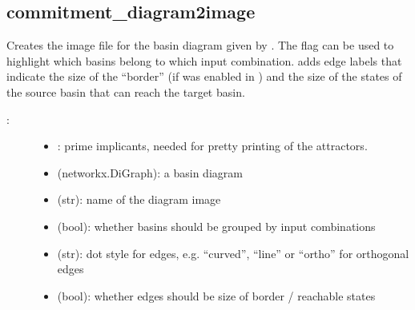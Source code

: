\documentclass[letterpaper,10pt,english]{sphinxmanual}
\begin{document}
\subsection{commitment\_diagram2image}
\label{\detokenize{Basins:id7}}\label{\detokenize{Basins:commitment-diagram2image}}

\begin{fulllineitems}
\label{\detokenize{Basins:PyBoolNet.Basins.commitment_diagram2image}}
Creates the image file  for the basin diagram given by .
The flag  can be used to highlight which basins belong to which input combination.
 adds edge labels that indicate the size of the “border” (if  was enabled in {\hyperref[\detokenize{Basins:commitment-diagram}]{}})
and the size of the states of the source basin that can reach the target basin.
\begin{description}
\item[{:}] \leavevmode\begin{itemize}
\item {} 
: prime implicants, needed for pretty printing of the attractors.

\item {} 
 (networkx.DiGraph): a basin diagram

\item {} 
 (str): name of the diagram image

\item {} 
 (bool): whether basins should be grouped by input combinations

\item {} 
 (str): dot style for edges, e.g. “curved”, “line” or “ortho” for orthogonal edges

\item {} 
 (bool): whether edges should be size of border / reachable states


\end{itemize}
\end{description}
\end{fulllineitems}
\end{document}
